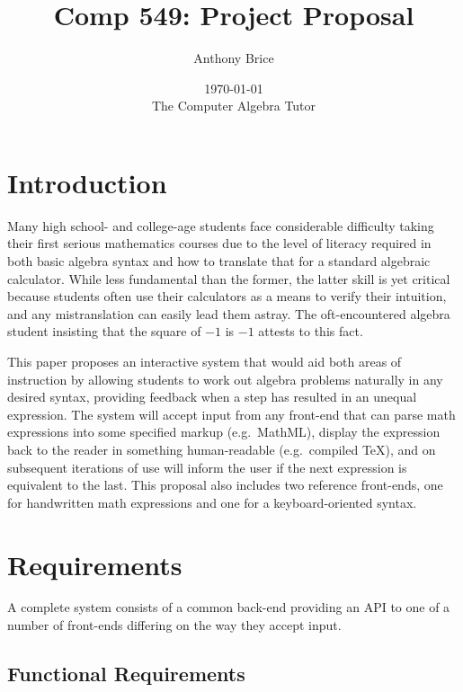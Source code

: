 \documentclass{abrice}
\title{Comp 549: Project Proposal}
\author{Anthony Brice}
\date{\today\protect\\ \bigskip The Computer Algebra Tutor}
\begin{document}
\maketitle

\section{Introduction}

Many high school- and college-age students face considerable difficulty taking
their first serious mathematics courses due to the level of literacy required in
both basic algebra syntax and how to translate that for a standard algebraic
calculator. While less fundamental than the former, the latter skill is yet
critical because students often use their calculators as a means to verify their
intuition, and any mistranslation can easily lead them astray. The
oft-encountered algebra student insisting that the square of $-1$ is $-1$
attests to this fact.

This paper proposes an interactive system that would aid both areas of
instruction by allowing students to work out algebra problems naturally in any
desired syntax, providing feedback when a step has resulted in an unequal
expression. The system will accept input from any front-end that can parse math
expressions into some specified markup (e.g.\ MathML), display the expression
back to the reader in something human-readable (e.g.\ compiled \TeX), and on
subsequent iterations of use will inform the user if the next expression is
equivalent to the last. This proposal also includes two reference front-ends,
one for handwritten math expressions and one for a keyboard-oriented syntax.

\section{Requirements}

A complete system consists of a common back-end providing an API to one of a
number of front-ends differing on the way they accept input.

\subsection{Functional Requirements}
\end{document}
